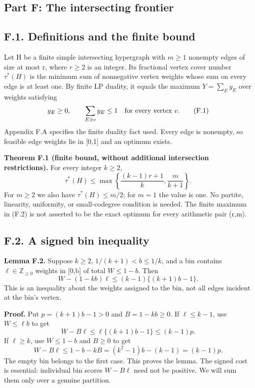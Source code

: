\documentclass[
  11pt,
]{article}
\begin{document}
\subsection{Part F: The intersecting
frontier}\label{part-f-the-intersecting-frontier}

\subsection{F.1. Definitions and the finite
bound}\label{f.1.-definitions-and-the-finite-bound}

Let H be a finite simple intersecting hypergraph with \(m\ge1\) nonempty
edges of size at most r, where \(r\ge2\) is an integer. Its fractional
vertex cover number \(\tau^*(H)\) is the minimum sum of nonnegative
vertex weights whose sum on every edge is at least one. By finite LP
duality, it equals the maximum \(Y=\sum_E y_E\) over weights satisfying
\[
                y_E\ge0,\qquad\sum_{E\ni v}y_E\le1
                  \quad\hbox{for every vertex }v.            \tag{F.1}
\] Appendix F.A specifies the finite duality fact used. Every edge is
nonempty, so feasible edge weights lie in {[}0,1{]} and an optimum
exists.

\textbf{Theorem F.1 (finite bound, without additional intersection
restrictions).} For every integer \(k\ge2\), \[
 \boxed{\displaystyle
 \tau^*(H)\le\max\left\{\frac{(k-1)r+1}{k},\frac{m}{k+1}\right\}.}
                                                               \tag{F.2}
\] For \(m\ge2\) we also have \(\tau^*(H)\le m/2\); for \(m=1\) the
value is one. No partite, linearity, uniformity, or small-codegree
condition is needed. The finite maximum in (F.2) is not asserted to be
the exact optimum for every arithmetic pair (r,m).

\subsection{F.2. A signed bin
inequality}\label{f.2.-a-signed-bin-inequality}

\textbf{Lemma F.2.} Suppose \(k\ge2\), \(1/(k+1)<b\le1/k\), and a bin
contains \(\ell\in\mathbb Z_{\ge0}\) weights in {[}0,b{]} of total
\(W\le1-b\). Then \[
 W-(1-kb)\ell\le(k-1)\{(k+1)b-1\}.                          \tag{F.3}
\] This is an inequality about the weights assigned to the bin, not all
edges incident at the bin's vertex.

\textbf{Proof.} Put \(p=(k+1)b-1>0\) and \(B=1-kb\ge0\). If
\(\ell\le k-1\), use \(W\le\ell b\) to get \[
 W-B\ell\le\ell\{(k+1)b-1\}\le(k-1)p.
\] If \(\ell\ge k\), use \(W\le1-b\) and \(B\ge0\) to get \[
 W-B\ell\le1-b-kB
              =(k^2-1)b-(k-1)=(k-1)p.
\] The empty bin belongs to the first case. This proves the lemma. The
signed cost is essential: individual bin scores \(W-B\ell\) need not be
positive. We will sum them only over a genuine partition.
\end{document}
